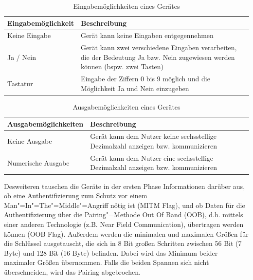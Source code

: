 \begin{table}[H]
    \begin{tabularx}{\textwidth}{|l|X|}
    \hline
    \textbf{Eingabemöglichkeit} & \textbf{Beschreibung} \\
    \hline
    Keine Eingabe & Gerät kann keine Eingaben entgegennehmen \\
    \hline
    Ja / Nein & Gerät kann zwei verschiedene Eingaben verarbeiten, die der Bedeutung Ja bzw. Nein zugewiesen werden können (bspw. zwei Tasten) \\
    \hline
    Tastatur & Eingabe der Ziffern 0 bis 9 möglich und die Möglichkeit Ja und Nein einzugeben \\
    \hline
    \end{tabularx}
    \caption[Eingabemöglichkeiten eines Gerätes]{Eingabemöglichkeiten eines Gerätes \cite{BtSpec4.0_1965}}
    \label{tab: i caps geraet}
\end{table}

\begin{table}[H]
    \begin{tabularx}{\textwidth}{|l|X|}
    \hline
    \textbf{Ausgabemöglichkeiten} & \textbf{Beschreibung} \\
    \hline
    Keine Ausgabe & Gerät kann dem Nutzer keine sechsstellige Dezimalzahl anzeigen bzw. kommunizieren \\
    \hline
    Numerische Ausgabe & Gerät kann dem Nutzer eine sechsstellige Dezimalzahl anzeigen bzw. kommunizieren \\
    \hline
    \end{tabularx}
    \caption[Ausgabemöglichkeiten eines Gerätes]{Ausgabemöglichkeiten eines Gerätes \cite{BtSpec4.0_1965_b}}
    \label{tab: o caps geraet}
\end{table}

Desweiteren tauschen die Geräte in der ersten Phase Informationen darüber aus, ob eine Authentifizierung zum Schutz vor einem Man"=In"=The"=Middle"=Angriff nötig ist (MITM Flag), und ob Daten für die Authentifizierung über die Pairing"=Methode Out Of Band (OOB), d.h. mittels einer anderen Technologie (z.B. Near Field Communication), übertragen werden können (OOB Flag). Außerdem werden die minimalen und maximalen Größen für die Schlüssel ausgetauscht, die sich in 8 Bit großen Schritten zwischen 56 Bit (7 Byte) und 128 Bit (16 Byte) befinden. Dabei wird das Minimum beider maximaler Größen übernommen. Falls die beiden Spannen sich nicht überschneiden, wird das Pairing abgebrochen.

